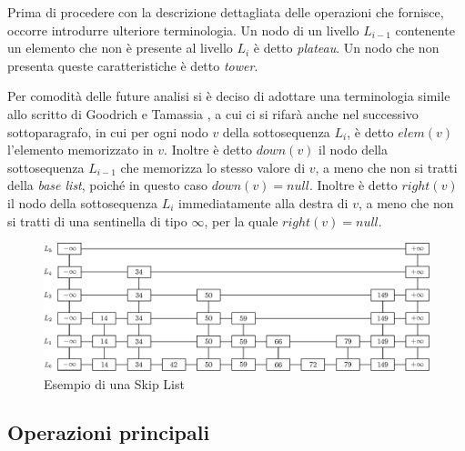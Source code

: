	Prima di procedere con la descrizione dettagliata delle operazioni che fornisce, occorre introdurre ulteriore terminologia. Un nodo di un livello $ L_{i-1} $ contenente un elemento che non è presente al livello $ L_{i} $ è detto \textit{plateau}. Un nodo che non presenta queste caratteristiche è detto \textit{tower}. \cite{authskiplist}
	
	Per comodità delle future analisi si è deciso di adottare una terminologia simile allo scritto di Goodrich e Tamassia \cite{authskiplist}, a cui ci si rifarà anche nel successivo sottoparagrafo, in cui per ogni nodo $ v $ della sottosequenza $ L_{i} $, è detto $ elem(v) $ l'elemento memorizzato in $ v $. Inoltre è detto $ down(v) $ il nodo della sottosequenza $ L_{i-1} $ che memorizza lo stesso valore di $ v $, a meno che non si tratti della \textit{base list}, poiché in questo caso $ down(v) = null$.
	Inoltre è detto $ right(v)$ il nodo della sottosequenza $ L_{i} $ immediatamente alla destra di $ v $, a meno che non si tratti di una sentinella di tipo $\infty$, per la quale $ right(v) = null$.
		
	\begin{figure}
		\centering
		\includegraphics[scale=0.6]{figure/skiplist.eps}
		\caption{Esempio di una Skip List}\label{fig:skiplist}
	\end{figure}
		
	\subsection{Operazioni principali}
	
%		

